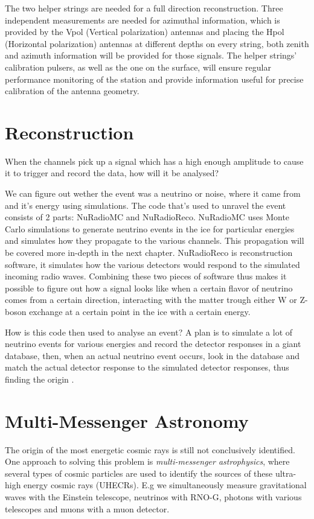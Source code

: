 The two helper strings are needed for a full direction reconstruction.
Three independent measurements are needed for azimuthal information, which is
provided by the Vpol (Vertical polarization) antennas and placing the Hpol
(Horizontal polarization) antennas at different depths on every string, both
zenith and azimuth information will be provided for those signals. The helper
strings' calibration pulsers, as well as the one on the surface, will ensure
regular performance monitoring of the station and provide information
useful for precise calibration of the antenna geometry.

\section{Reconstruction}
When the channels pick up a signal which has a high enough amplitude to
cause it to trigger and record the data, how will it be analysed?

We can figure out wether the event was a neutrino or noise, where it came from
and it's energy using simulations. The code that's used to unravel the event
consists of 2 parts: NuRadioMC\cite{Glaser_2020} and
NuRadioReco\cite{Glaser_2019}. NuRadioMC uses Monte Carlo simulations to
generate neutrino events in the ice for particular energies and simulates how
they propagate to the various channels. This propagation will be covered more
in-depth in the next chapter.  NuRadioReco is reconstruction software, it
simulates how the various detectors would respond to the simulated incoming
radio waves.  Combining these two pieces of software thus makes it possible to
figure out how a signal looks like when a certain flavor of neutrino  
comes from a certain direction, interacting with the matter trough
either W or Z-boson exchange at a certain point in the ice with a certain
energy. 

How is this code then used to analyse an event?
A plan \cite{lookuptable} is to simulate a lot of neutrino events for various energies and
record the detector responses in a giant database, then, when an actual neutrino
event occurs, look in the database and match the actual
detector response to the simulated detector responses, thus finding the origin .

\section{Multi-Messenger Astronomy}
The origin of the most energetic cosmic rays is still not conclusively
identified. One approach to solving this problem is \textit{multi-messenger
astrophysics}, where several types of cosmic particles are used to identify the
sources of these ultra-high energy cosmic rays (UHECRs). E.g we simultaneously
measure gravitational waves with the Einstein telescope, neutrinos with RNO-G,
photons with various telescopes and muons with a muon detector.

